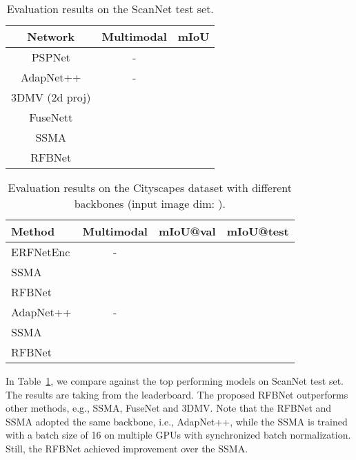 \documentclass[letterpaper, 10 pt, conference]{ieeeconf}
\begin{document}
	\begin{table}[t]
		\footnotesize 
		\centering
		\caption{Evaluation results on the ScanNet test set.}
		\label{tab_scannet_test}
		\begin{threeparttable}
			\begin{tabular}{c c c}
				\toprule
				Network & Multimodal & mIoU \\
				\midrule
				PSPNet\cite{zhao2016pyramid}    & - & 		\\
				AdapNet++\cite{valada2019self} & - &  	\\
				3DMV (2d proj)\cite{dai20183dmv} & \checkmark &  	\\
				FuseNett\cite{hazirbas2016fusenet} & \checkmark &   		\\
				SSMA\cite{valada2019self} & \checkmark &  \\
				RFBNet & \checkmark & 	\\
				\bottomrule
			\end{tabular}
		\end{threeparttable}
	\end{table}
	\begin{table}[t]
		\footnotesize 
		\centering
		\caption{Evaluation results on the Cityscapes dataset with different backbones (input image dim: ).}
		\label{tab_cityscapes_test}
		\begin{threeparttable}
			\begin{tabular}{l c c c}
				\toprule
				Method & Multimodal & mIoU@val & mIoU@test \\
				\midrule
				ERFNetEnc & - &  & 		\\
				SSMA & \checkmark &  & 	\\
				RFBNet & \checkmark	&  	 &  \\
				\midrule
				AdapNet++ & - &    & 		\\
				SSMA & \checkmark &  &  	\\
				RFBNet & \checkmark & 	 &  \\
				\bottomrule
			\end{tabular}
		\end{threeparttable}
	\end{table}	
	
	In Table~\ref{tab_scannet_test}, we compare against the top performing models on ScanNet test set. The results are taking from the leaderboard. The proposed RFBNet outperforms other methods, e.g., SSMA\cite{valada2019self}, FuseNet\cite{hazirbas2016fusenet} and 3DMV\cite{dai20183dmv}. Note that the RFBNet and SSMA adopted the same backbone, i.e., AdapNet++, while the SSMA is trained with a batch size of 16 on multiple GPUs with synchronized batch normalization.
	Still, the RFBNet achieved  improvement over the SSMA. 
	
\end{document}
